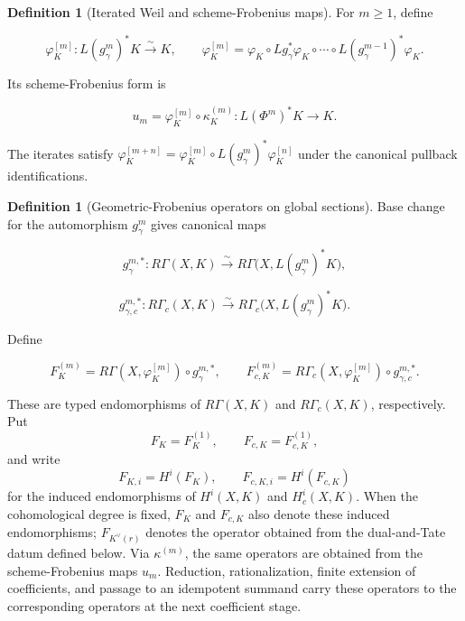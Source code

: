\documentclass[10pt]{article}
\theoremstyle{definition}
\newtheorem{definition}[theorem]{Definition}
\newcommand{\RG}{R\Gamma}
\newcommand{\RGc}{R\Gamma_c}
\begin{document}
\begin{definition}[Iterated Weil and scheme-Frobenius maps]
For \(m\geq1\), define

\[
 \varphi_K^{[m]}:
 L(g_\gamma^m)^*K\xrightarrow{\sim}K,
 \qquad
 \varphi_K^{[m]}=
 \varphi_K\circ Lg_\gamma^*\varphi_K\circ\cdots\circ
 L(g_\gamma^{m-1})^*\varphi_K.
\]

Its scheme-Frobenius form is

\[
 u_m=\varphi_K^{[m]}\circ\kappa_K^{(m)}:
 L(\Phi^m)^*K\longrightarrow K.
\]

The iterates satisfy
\(
 \varphi_K^{[m+n]}=
 \varphi_K^{[m]}\circ L(g_\gamma^m)^*\varphi_K^{[n]}
\)
under the canonical pullback identifications.
\end{definition}

\begin{definition}[Geometric-Frobenius operators on global sections]
Base change for the automorphism \(g_\gamma^m\) gives canonical maps

\[
 g_{\gamma}^{m,*}:\RG(X,K)\xrightarrow{\sim}
 \RG\bigl(X,L(g_\gamma^m)^*K\bigr),
\]

\[
 g_{\gamma,c}^{m,*}:\RGc(X,K)\xrightarrow{\sim}
 \RGc\bigl(X,L(g_\gamma^m)^*K\bigr).
\]

Define

\[
 F_K^{(m)}=\RG(X,\varphi_K^{[m]})\circ g_\gamma^{m,*},
 \qquad
 F_{c,K}^{(m)}=\RGc(X,\varphi_K^{[m]})\circ g_{\gamma,c}^{m,*}.
\]

These are typed endomorphisms of \(\RG(X,K)\) and \(\RGc(X,K)\),
respectively.  Put
\[
 F_K=F_K^{(1)},\qquad F_{c,K}=F_{c,K}^{(1)},
\]
and write
\[
 F_{K,i}=H^i(F_K),\qquad F_{c,K,i}=H^i(F_{c,K})
\]
for the induced endomorphisms of \(H^i(X,K)\) and \(H_c^i(X,K)\).
When the cohomological degree is fixed, \(F_K\) and \(F_{c,K}\) also denote
these induced endomorphisms; \(F_{K^\vee(r)}\) denotes the operator obtained
from the dual-and-Tate datum defined below.
Via \(\kappa^{(m)}\), the same operators are obtained from the
scheme-Frobenius maps \(u_m\).  Reduction, rationalization, finite extension
of coefficients, and passage to an idempotent summand carry these operators
to the corresponding operators at the next coefficient stage.
\end{definition}
\end{document}
